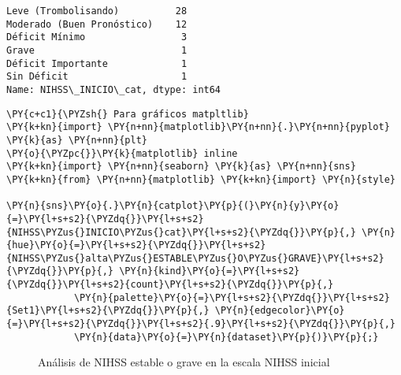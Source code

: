 
            \begin{tcolorbox}[breakable, size=fbox, boxrule=.5pt, pad at break*=1mm, opacityfill=0]
\begin{Verbatim}[commandchars=\\\{\}]
Leve (Trombolisando)          28
Moderado (Buen Pronóstico)    12
Déficit Mínimo                 3
Grave                          1
Déficit Importante             1
Sin Déficit                    1
Name: NIHSS\_INICIO\_cat, dtype: int64
\end{Verbatim}
\end{tcolorbox}
        
    \begin{tcolorbox}[breakable, size=fbox, boxrule=1pt, pad at break*=1mm,colback=cellbackground, colframe=cellborder]
\begin{Verbatim}[commandchars=\\\{\}]
\PY{c+c1}{\PYZsh{} Para gráficos matpltlib}
\PY{k+kn}{import} \PY{n+nn}{matplotlib}\PY{n+nn}{.}\PY{n+nn}{pyplot} \PY{k}{as} \PY{n+nn}{plt}
\PY{o}{\PYZpc{}}\PY{k}{matplotlib} inline
\PY{k+kn}{import} \PY{n+nn}{seaborn} \PY{k}{as} \PY{n+nn}{sns}
\PY{k+kn}{from} \PY{n+nn}{matplotlib} \PY{k+kn}{import} \PY{n}{style}

\PY{n}{sns}\PY{o}{.}\PY{n}{catplot}\PY{p}{(}\PY{n}{y}\PY{o}{=}\PY{l+s+s2}{\PYZdq{}}\PY{l+s+s2}{NIHSS\PYZus{}INICIO\PYZus{}cat}\PY{l+s+s2}{\PYZdq{}}\PY{p}{,} \PY{n}{hue}\PY{o}{=}\PY{l+s+s2}{\PYZdq{}}\PY{l+s+s2}{NIHSS\PYZus{}alta\PYZus{}ESTABLE\PYZus{}O\PYZus{}GRAVE}\PY{l+s+s2}{\PYZdq{}}\PY{p}{,} \PY{n}{kind}\PY{o}{=}\PY{l+s+s2}{\PYZdq{}}\PY{l+s+s2}{count}\PY{l+s+s2}{\PYZdq{}}\PY{p}{,}
            \PY{n}{palette}\PY{o}{=}\PY{l+s+s2}{\PYZdq{}}\PY{l+s+s2}{Set1}\PY{l+s+s2}{\PYZdq{}}\PY{p}{,} \PY{n}{edgecolor}\PY{o}{=}\PY{l+s+s2}{\PYZdq{}}\PY{l+s+s2}{.9}\PY{l+s+s2}{\PYZdq{}}\PY{p}{,}
            \PY{n}{data}\PY{o}{=}\PY{n}{dataset}\PY{p}{)}\PY{p}{;}
\end{Verbatim}
\end{tcolorbox}

\begin{center}
    	\begin{figure}[H]
	\centering
	\caption{Análisis de NIHSS estable o grave en la escala NIHSS inicial}
	\label{fig:aNISSNISS}
	\end{figure}
\end{center}
    
